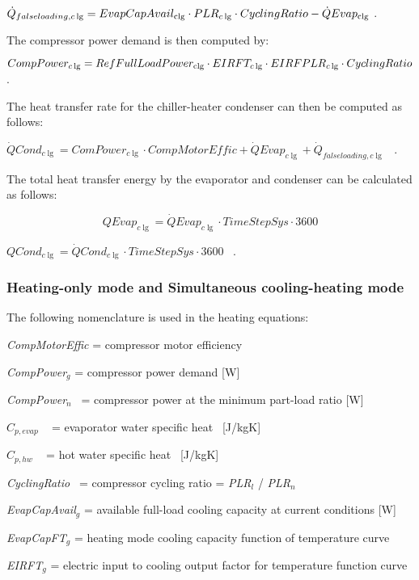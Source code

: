 \({\dot Q_{falseloading,c\lg }} = EvapCapAvai{l_{{\rm{clg}}}} \cdot PL{R_{c\lg }} \cdot CyclingRatio - \dot QEva{p_{{\rm{clg}}}}\) .

The compressor power demand is then computed by:

\(CompPowe{r_{c\lg }} = RefFullLoadPowe{r_{{\rm{clg}}}} \cdot {\rm{ }}EIRF{T_{c\lg }}{\rm{ }} \cdot EIRFPL{R_{c\lg }} \cdot CyclingRatio\) .

The heat transfer rate for the chiller-heater condenser can then be computed as follows:

\(\dot QCon{d_{c\lg }} = ComPowe{r_{c\lg }} \cdot CompMotorEffic + \dot QEva{p_{c\lg }} + {\dot Q_{falseloading,c\lg }}\) ~.

The total heat transfer energy by the evaporator and condenser can be calculated as follows:

\begin{equation}
QEva{p_{c\lg }} = \dot QEva{p_{c\lg }} \cdot TimeStepSys \cdot 3600
\end{equation}

\(QCon{d_{c\lg }} = \dot QCon{d_{c\lg }} \cdot TimeStepSys \cdot 3600\) ~.

\subsubsection{Heating-only mode and Simultaneous cooling-heating mode}\label{heating-only-mode-and-simultaneous-cooling-heating-mode}

The following nomenclature is used in the heating equations:

\emph{CompMotorEffic} = compressor motor efficiency

\emph{CompPower\(_{g}\)} = compressor power demand {[}W{]}

\emph{CompPower\(_{n}\)}~ = compressor power at the minimum part-load ratio {[}W{]}

\({C_{p,evap}}\) ~ = evaporator water specific heat~ {[}J/kgK{]}

\({C_{p,hw}}\) ~ = hot water specific heat~ {[}J/kgK{]}

\emph{CyclingRatio}~ = compressor cycling ratio = \emph{PLR\(_{l}\)} / \emph{PLR\(_{n}\)}

\emph{EvapCapAvail\(_{g}\)} = available full-load cooling capacity at current conditions {[}W{]}

\emph{EvapCapFT\(_{g}\)} = heating mode cooling capacity function of temperature curve

\emph{EIRFT\(_{g}\)} = electric input to cooling output factor for temperature function curve

